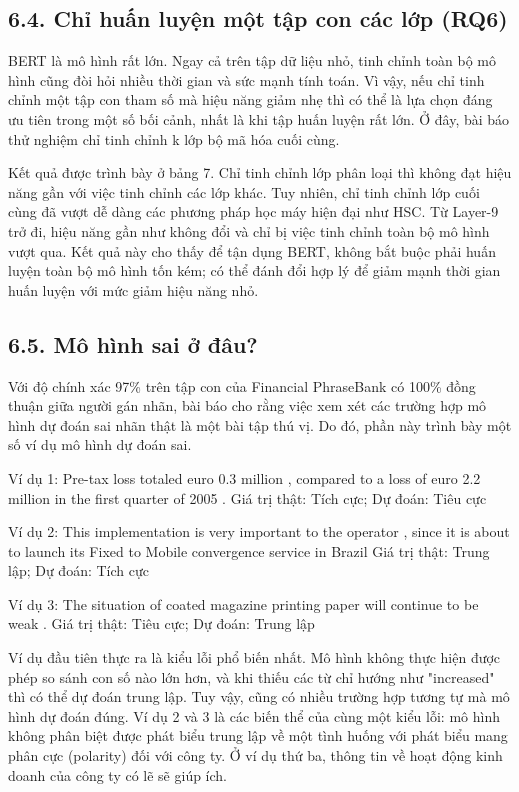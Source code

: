 \subsection{6.4. Chỉ huấn luyện một tập con các lớp (RQ6)}

BERT là mô hình rất lớn. Ngay cả trên tập dữ liệu nhỏ, tinh chỉnh toàn bộ mô hình cũng đòi hỏi nhiều thời gian và sức mạnh tính toán. Vì vậy, nếu chỉ tinh chỉnh một tập con tham số mà hiệu năng giảm nhẹ thì có thể là lựa chọn đáng ưu tiên trong một số bối cảnh, nhất là khi tập huấn luyện rất lớn. Ở đây, bài báo thử nghiệm chỉ tinh chỉnh k lớp bộ mã hóa cuối cùng.

Kết quả được trình bày ở bảng 7. Chỉ tinh chỉnh lớp phân loại thì không đạt hiệu năng gần với việc tinh chỉnh các lớp khác. Tuy nhiên, chỉ tinh chỉnh lớp cuối cùng đã vượt dễ dàng các phương pháp học máy hiện đại như HSC. Từ Layer-9 trở đi, hiệu năng gần như không đổi và chỉ bị việc tinh chỉnh toàn bộ mô hình vượt qua. Kết quả này cho thấy để tận dụng BERT, không bắt buộc phải huấn luyện toàn bộ mô hình tốn kém; có thể đánh đổi hợp lý để giảm mạnh thời gian huấn luyện với mức giảm hiệu năng nhỏ.

\subsection{6.5. Mô hình sai ở đâu?}

Với độ chính xác 97\% trên tập con của Financial PhraseBank có 100\% đồng thuận giữa người gán nhãn, bài báo cho rằng việc xem xét các trường hợp mô hình dự đoán sai nhãn thật là một bài tập thú vị. Do đó, phần này trình bày một số ví dụ mô hình dự đoán sai.

Ví dụ 1: Pre-tax loss totaled euro 0.3 million , compared to a loss of euro 2.2 million in the first quarter of 2005 . Giá trị thật: Tích cực; Dự đoán: Tiêu cực

Ví dụ 2: This implementation is very important to the operator , since it is about to launch its Fixed to Mobile convergence service in Brazil Giá trị thật: Trung lập; Dự đoán: Tích cực

Ví dụ 3: The situation of coated magazine printing paper will continue to be weak . Giá trị thật: Tiêu cực; Dự đoán: Trung lập

Ví dụ đầu tiên thực ra là kiểu lỗi phổ biến nhất. Mô hình không thực hiện được phép so sánh con số nào lớn hơn, và khi thiếu các từ chỉ hướng như "increased" thì có thể dự đoán trung lập. Tuy vậy, cũng có nhiều trường hợp tương tự mà mô hình dự đoán đúng. Ví dụ 2 và 3 là các biến thể của cùng một kiểu lỗi: mô hình không phân biệt được phát biểu trung lập về một tình huống với phát biểu mang phân cực (polarity) đối với công ty. Ở ví dụ thứ ba, thông tin về hoạt động kinh doanh của công ty có lẽ sẽ giúp ích.

